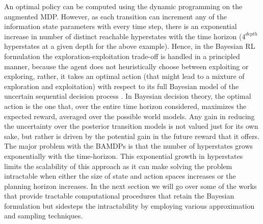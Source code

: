 An optimal policy can be computed using the dynamic programming on the augmented MDP. However, as each transition can increment any of the information state parameters with every time step, there is an exponential increase in number of distinct reachable hyperstates with the time horizon ($4^{depth}$ hyperstates at a given depth for the above example). 
Hence, in the Bayesian RL formulation the exploration-exploitation trade-off is handled in a principled manner, because the agent does not heuristically choose between exploiting or exploring, rather, it takes an optimal action (that might lead to a mixture of exploration and exploitation) with respect to its full Bayesian model of the uncertain sequential decision process . In Bayesian decision theory, the optimal action is the one that, over the entire time horizon considered, maximizes the expected reward, averaged over the possible world models. Any gain in reducing the uncertainty over the posterior transition models is not valued just for its own sake, but rather is driven by the potential gain in the future reward that it offers. 
The major problem with the BAMDPs is that the number of hyperstates grows exponentially with the time-horizon. 
This exponential growth in hyperstates limits the scalability of this approach as it can make solving the problem intractable when either the size of state and action spaces increases or the planning horizon increases.
In the next section we will go over some of the works that provide tractable computational procedures that retain the Bayesian formulation but sidesteps the intractability by employing various approximation and sampling techniques.



